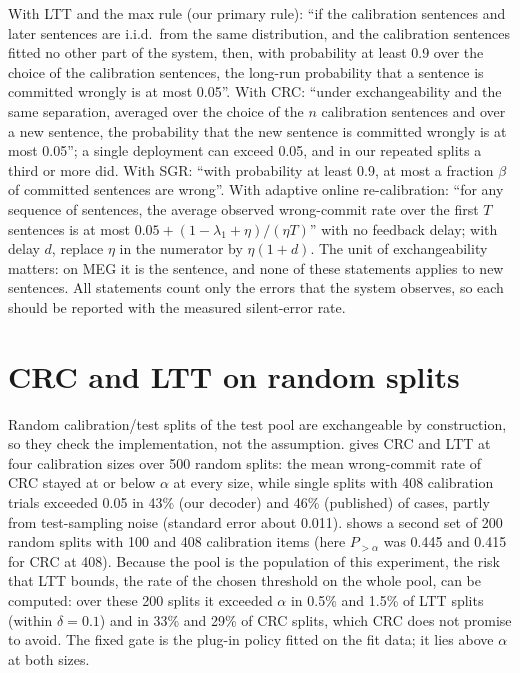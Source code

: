 With LTT and the max rule (our primary rule): ``if the calibration sentences and later sentences are i.i.d.\ from the same distribution, and the calibration sentences fitted no other part of the system, then, with probability at least 0.9 over the choice of the calibration sentences, the long-run probability that a sentence is committed wrongly is at most 0.05''. With CRC: ``under exchangeability and the same separation, averaged over the choice of the $n$ calibration sentences and over a new sentence, the probability that the new sentence is committed wrongly is at most 0.05''; a single deployment can exceed 0.05, and in our repeated splits a third or more did. With SGR: ``with probability at least 0.9, at most a fraction $\beta$ of committed sentences are wrong''. With adaptive online re-calibration: ``for any sequence of sentences, the average observed wrong-commit rate over the first $T$ sentences is at most $0.05 + (1 - \lambda_1 + \eta)/(\eta T)$'' with no feedback delay; with delay $d$, replace $\eta$ in the numerator by $\eta(1+d)$. The unit of exchangeability matters: on MEG it is the sentence, and none of these statements applies to new sentences. All statements count only the errors that the system observes, so each should be reported with the measured silent-error rate.

\FloatBarrier
\section{CRC and LTT on random splits}
\label{app:more}

Random calibration/test splits of the test pool are exchangeable by construction, so they check the implementation, not the assumption.  gives CRC and LTT at four calibration sizes over 500 random splits: the mean wrong-commit rate of CRC stayed at or below $\alpha$ at every size, while single splits with 408 calibration trials exceeded 0.05 in 43\% (our decoder) and 46\% (published) of cases, partly from test-sampling noise (standard error about 0.011).  shows a second set of 200 random splits with 100 and 408 calibration items (here $P_{>\alpha}$ was 0.445 and 0.415 for CRC at 408). Because the pool is the population of this experiment, the risk that LTT bounds, the rate of the chosen threshold on the whole pool, can be computed: over these 200 splits it exceeded $\alpha$ in 0.5\% and 1.5\% of LTT splits (within $\delta = 0.1$) and in 33\% and 29\% of CRC splits, which CRC does not promise to avoid. The fixed gate is the plug-in policy fitted on the fit data; it lies above $\alpha$ at both sizes.

